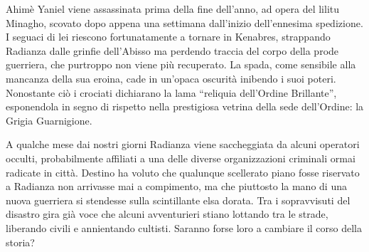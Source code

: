 Ahim\`e Yaniel viene assassinata prima della fine dell'anno, ad opera del lilitu Minagho, scovato dopo appena una settimana dall'inizio dell'ennesima spedizione. I seguaci di lei riescono fortunatamente a tornare in Kenabres, strappando Radianza dalle grinfie dell'Abisso ma perdendo traccia del corpo della prode guerriera, che purtroppo non viene pi\`u recuperato. La spada, come sensibile alla mancanza della sua eroina, cade in un'opaca oscurit\`a inibendo i suoi poteri. Nonostante ci\`o i crociati dichiarano la lama ``reliquia dell'Ordine Brillante'', esponendola in segno di rispetto nella prestigiosa vetrina della sede dell'Ordine: la Grigia Guarnigione.

A qualche mese dai nostri giorni Radianza viene saccheggiata da alcuni operatori occulti, probabilmente affiliati a una delle diverse organizzazioni criminali ormai radicate in citt\`a. Destino ha voluto che qualunque scellerato piano fosse riservato a Radianza non arrivasse mai a compimento, ma che piuttosto la mano di una nuova guerriera si stendesse sulla scintillante elsa dorata. Tra i sopravvisuti del disastro gira gi\`a voce che alcuni avventurieri stiano lottando tra le strade, liberando civili e annientando cultisti. Saranno forse loro a cambiare il corso della storia?